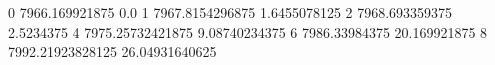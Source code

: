 0 7966.169921875 0.0
1 7967.8154296875 1.6455078125
2 7968.693359375 2.5234375
4 7975.25732421875 9.08740234375
6 7986.33984375 20.169921875
8 7992.21923828125 26.04931640625

